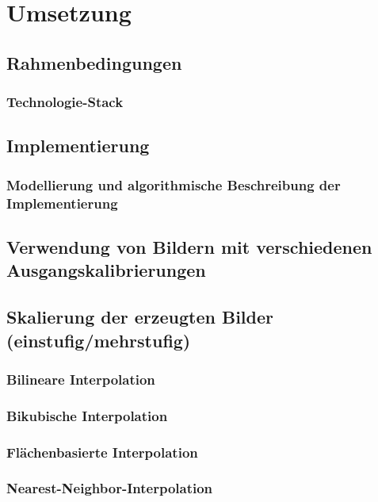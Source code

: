 \documentclass[
fontsize=10pt, 
listof = totoc,
parskip = half	
]{report}
\begin{document}
\chapter{Umsetzung}

\section{Rahmenbedingungen}

\subsection{Technologie-Stack}

\section{Implementierung}

\subsection{Modellierung und algorithmische Beschreibung der Implementierung}

\section{Verwendung von Bildern mit verschiedenen Ausgangskalibrierungen}

\section{Skalierung der erzeugten Bilder (einstufig/mehrstufig)}

\subsection{Bilineare Interpolation}

\subsection{Bikubische Interpolation}

\subsection{Flächenbasierte Interpolation}

\subsection{Nearest-Neighbor-Interpolation}
\end{document}
